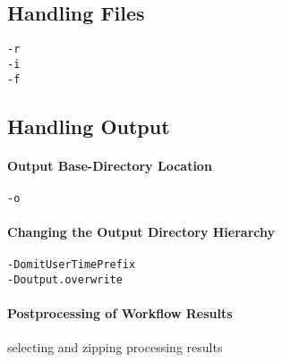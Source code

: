 \subsection{Handling Files}

\begin{verbatim}
-r
-i
-f
\end{verbatim}
\subsection{Handling Output}

\paragraph{Output Base-Directory Location}
\begin{verbatim}
-o
\end{verbatim}
\paragraph{Changing the Output Directory Hierarchy}
\begin{verbatim}
-DomitUserTimePrefix
-Doutput.overwrite
\end{verbatim}
\paragraph{Postprocessing of Workflow Results}
selecting and zipping processing results

\subsection{}

